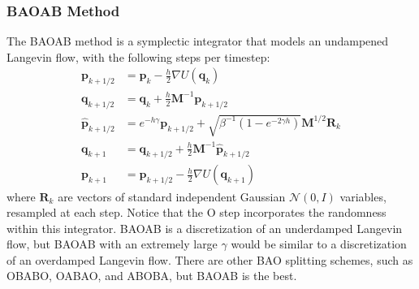     \subsubsection{BAOAB Method}

      The BAOAB method is a symplectic integrator that models an undampened Langevin flow, with the following steps per timestep: 
      \begin{align*}
        \mathbf{p}_{k + 1/2} & = \mathbf{p}_k - \frac{h}{2} \nabla U(\mathbf{q}_k) \\
        \mathbf{q}_{k + 1/2} & = \mathbf{q}_k + \frac{h}{2} \mathbf{M}^{-1} \mathbf{p}_{k + 1/2} \\
        \mathbf{\hat{p}}_{k + 1/2} & = e^{-h \gamma} \mathbf{p}_{k + 1/2} + \sqrt{\beta^{-1} (1 - e^{-2\gamma h})} \mathbf{M}^{1/2} \mathbf{R}_k \\ 
        \mathbf{q}_{k + 1} & = \mathbf{q}_{k + 1/2} + \frac{h}{2} \mathbf{M}^{-1} \mathbf{\hat{p}}_{k + 1/2} \\
        \mathbf{p}_{k + 1} & = \mathbf{\hat{p}}_{k + 1/2} - \frac{h}{2} \nabla U(\mathbf{q}_{k + 1}) 
      \end{align*}
      where $\mathbf{R}_k$ are vectors of standard independent Gaussian $\mathcal{N}(0, I)$ variables, resampled at each step. Notice that the O step incorporates the randomness within this integrator. 
      BAOAB is a discretization of an underdamped Langevin flow, but BAOAB with an extremely large $\gamma$ would be similar to a discretization of an overdamped Langevin flow. There are other BAO splitting schemes, such as OBABO, OABAO, and ABOBA, but BAOAB is the best. 

